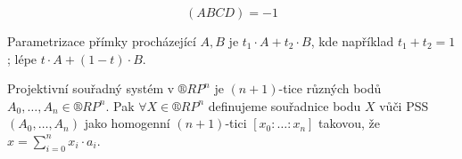 \documentclass[12pt]{article}					%
\begin{document}
\begin{definice}
	$$ (ABCD) = -1 $$
\end{definice}

\begin{priklad}
	Parametrizace přímky procházející $A, B$ je $t_1·A + t_2·B$, kde například $t_1 + t_2 = 1$; lépe $t·A + (1 - t)·B$.
\end{priklad}

\begin{definice}
	Projektivní souřadný systém v $®RP^n$ je $(n+1)$-tice různých bodů $A_0, …, A_n \in ®RP^n$. Pak $\forall X \in ®RP^n$ definujeme souřadnice bodu $X$ vůči PSS $(A_0, …, A_n)$ jako homogenní $(n+1)$-tici $[x_0:…:x_n]$ takovou, že $x = \sum_{i=0}^n x_i·a_i$.
\end{definice}
\end{document}

